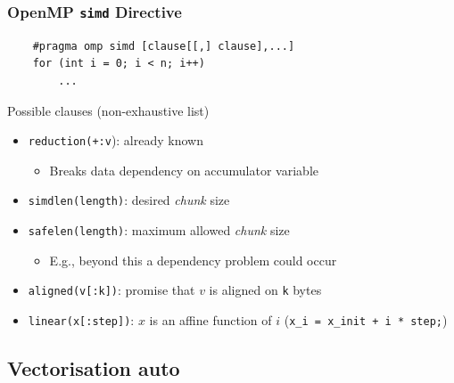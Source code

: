 \documentclass[xcolor={x11names,svgnames}]{beamer}
\begin{document}
\begin{frame}[fragile=singleslide]
  \frametitle{OpenMP \texttt{simd} Directive}
  
  \begin{verbatim}
    #pragma omp simd [clause[[,] clause],...]
    for (int i = 0; i < n; i++)
        ...
   \end{verbatim}

   \begin{block}{Possible clauses (non-exhaustive list)}
     \begin{itemize}
     \item \texttt{reduction(+:v}): already known 
       \begin{itemize}
       \item Breaks data dependency on accumulator variable
       \end{itemize}
       \smallskip
       
     \item \texttt{simdlen(length)}: desired \textit{chunk} size
\smallskip
       
     \item \texttt{safelen(length)}: maximum allowed \textit{chunk} size
       \begin{itemize}
       \item E.g., beyond this a dependency problem could occur
       \end{itemize}
\smallskip
       
     \item \texttt{aligned(v[:k])}: promise that $v$ is aligned on \texttt{k} bytes
\smallskip


     \item \texttt{linear(x[:step])}: $x$ is an affine function of $i$ (\texttt{x_i = x_init + i * step;})
     \end{itemize}
   \end{block}
 \end{frame}


\subsection{Vectorisation auto}

\end{document}
